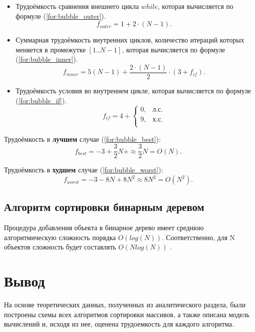 \begin{itemize}
	\item Трудоёмкость сравнения внешнего цикла $while$, которая вычисляется по формуле (\ref{for:bubble_outer}).
	\begin{equation}
		\label{for:bubble_outer}
		f_{outer} = 1 + 2 \cdot (N - 1).
	\end{equation}
	\item Суммарная трудоёмкость внутренних циклов, количество итераций которых меняется в промежутке $[1..N-1]$, которая вычисляется по формуле (\ref{for:bubble_inner}).
	\begin{equation}
		\label{for:bubble_inner}
		f_{inner} = 5(N - 1) + \frac{2 \cdot (N - 1)}{2} \cdot (3 + f_{if}).
	\end{equation}
	\item Трудоёмкость условия во внутреннем цикле, которая вычисляется по формуле (\ref{for:bubble_if}).
	\begin{equation}
		\label{for:bubble_if}
		f_{if} = 4 + \begin{cases}
			0, & \text{л.с.}\\
			9, & \text{х.с.}\\
		\end{cases}
	\end{equation}
\end{itemize}

Трудоёмкость в \textbf{лучшем} случае (\ref{for:bubble_best}):
\begin{equation}
	\label{for:bubble_best}
	f_{best} = -3 + \frac{3}{2} N + \approx \frac{3}{2} N = O(N).
\end{equation}

Трудоёмкость в \textbf{худшем} случае (\ref{for:bubble_worst}):
\begin{equation}
	\label{for:bubble_worst}
	f_{worst} = -3 - 8N + 8N^2 \approx 8N^2 = O(N^2).
\end{equation}

\subsection{Алгоритм сортировки бинарным деревом}
Процедура добавления объекта в бинарное дерево имеет среднюю алгоритмическую сложность порядка $O(log(N))$. Соответственно, для N объектов сложность будет составлять $O(N log(N))$ \cite{otree}.

\section{Вывод}
На основе теоретических данных, полученных из аналитического раздела, были построены схемы всех алгоритмов сортировки массивов, а также описана модель вычислений и, исходя из нее, оценена трудоемкость для каждого алгоритма. 
